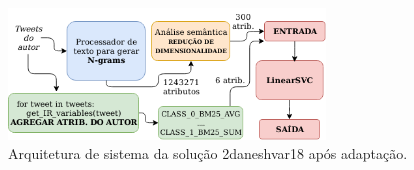 \begin{figure}[ht]
    \centering
    \caption{Arquitetura de sistema da solução 2\underscore{}daneshvar18 após adaptação.}
    \begin{center}
        \includegraphics[width=0.75\textwidth]{img/2-daneshvar18-arquitetura-com-ri.png}
    \end{center}
    \vspace{-0.5cm}
    \label{fig:2-daneshvar18-arquitetura-com-ri}
\end{figure}